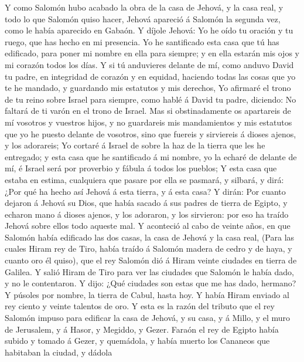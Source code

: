  Y como Salomón hubo acabado la obra de la casa de Jehová,
y la casa real, y todo lo que Salomón quiso hacer,  Jehová
apareció á Salomón la segunda vez, como le había aparecido en Gabaón.
 Y díjole Jehová: Yo he oído tu oración y tu ruego, que
has hecho en mi presencia. Yo he santificado esta casa que tú has
edificado, para poner mi nombre en ella para siempre; y en ella estarán
mis ojos y mi corazón todos los días.  Y si tú anduvieres
delante de mí, como anduvo David tu padre, en integridad de corazón y en
equidad, haciendo todas las cosas que yo te he mandado, y guardando mis
estatutos y mis derechos,  Yo afirmaré el trono de tu
reino sobre Israel para siempre, como hablé á David tu padre, diciendo:
No faltará de ti varón en el trono de Israel.  Mas si
obstinadamente os apartareis de mí vosotros y vuestros hijos, y no
guardareis mis mandamientos y mis estatutos que yo he puesto delante de
vosotros, sino que fuereis y sirviereis á dioses ajenos, y los
adorareis;  Yo cortaré á Israel de sobre la haz de la
tierra que les he entregado; y esta casa que he santificado á mi nombre,
yo la echaré de delante de mí, é Israel será por proverbio y fábula á
todos los pueblos;  Y esta casa que estaba en estima,
cualquiera que pasare por ella se pasmará, y silbará, y dirá: ¿Por qué
ha hecho así Jehová á esta tierra, y á esta casa?  Y
dirán: Por cuanto dejaron á Jehová su Dios, que había sacado á sus
padres de tierra de Egipto, y echaron mano á dioses ajenos, y los
adoraron, y los sirvieron: por eso ha traído Jehová sobre ellos todo
aqueste mal.  Y aconteció al cabo de veinte años, en que
Salomón había edificado las dos casas, la casa de Jehová y la casa real,
 (Para las cuales Hiram rey de Tiro, había traído á
Salomón madera de cedro y de haya, y cuanto oro él quiso), que el rey
Salomón dió á Hiram veinte ciudades en tierra de Galilea.
 Y salió Hiram de Tiro para ver las ciudades que Salomón
le había dado, y no le contentaron.  Y dijo: ¿Qué
ciudades son estas que me has dado, hermano? Y púsoles por nombre, la
tierra de Cabul, hasta hoy.  Y había Hiram enviado al rey
ciento y veinte talentos de oro.  Y esta es la razón del
tributo que el rey Salomón impuso para edificar la casa de Jehová, y su
casa, y á Millo, y el muro de Jerusalem, y á Hasor, y Megiddo, y Gezer.
 Faraón el rey de Egipto había subido y tomado á Gezer, y
quemádola, y había muerto los Cananeos que habitaban la ciudad, y dádola
